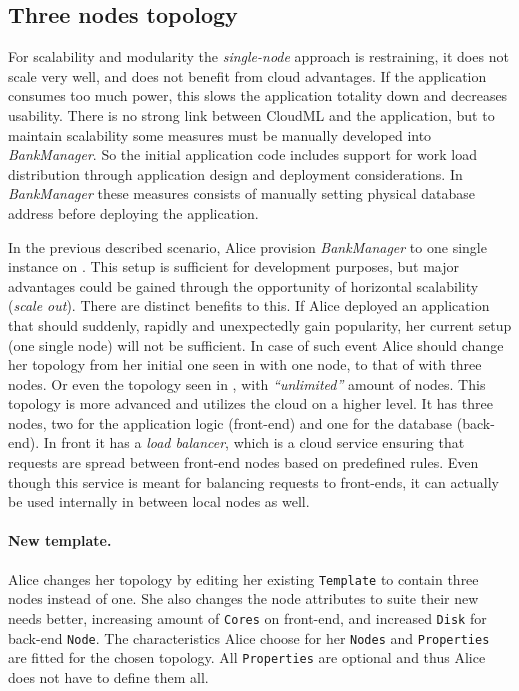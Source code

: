 \subsection{Three nodes topology}

For scalability and modularity the \emph{single-node} approach is restraining,
\ie it does not scale very well, and does not benefit from cloud advantages.
If the application consumes too much  power, 
this slows the application totality down and decreases usability.
There is no strong link between CloudML and the application, but to maintain
scalability some measures must be manually developed into \emph{BankManager}.
So the initial application code includes support for work load distribution through 
application design and deployment considerations.
In \emph{BankManager} these measures consists of manually setting 
physical database address before deploying the application.

In the previous described scenario, 
Alice provision \emph{BankManager} to one single instance on .
This setup is sufficient for development purposes, but major advantages
could be gained through the opportunity of horizontal scalability (\emph{scale out}).
There are distinct benefits to this.
If Alice deployed an application that should suddenly, 
rapidly and unexpectedly gain popularity, her current setup (one single node) will not be sufficient.
In case of such event Alice should change her topology from her initial one seen in 
 with one node, to that of  with three nodes.
Or even the topology seen in , with \emph{``unlimited''} amount of nodes.
This topology is more advanced and utilizes the cloud on a higher level.
It has three nodes, two for the application logic (front-end) and one for the database (back-end).
In front it has a \emph{load balancer}, which is a cloud service ensuring that requests
are spread between front-end nodes based on predefined rules.
Even though this service is meant for balancing requests to front-ends,
it can actually be used internally in between local nodes as well.

\paragraph{New template.}

Alice changes her topology by editing her existing \texttt{Template} 
to contain three nodes instead of one. 
She also changes the node attributes to suite their new needs better,
\ie increasing amount of \texttt{Cores} on front-end, and increased \texttt{Disk} for back-end \texttt{Node}.
The characteristics Alice choose for her \texttt{Nodes} and \texttt{Properties} are fitted
for the chosen topology.
All \texttt{Properties} are optional and thus Alice does not have to define them all.

